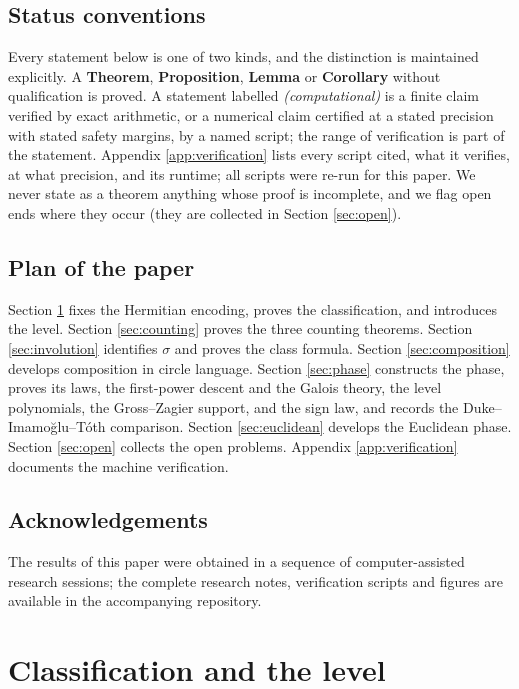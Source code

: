 \documentclass[11pt]{amsart}
\numberwithin{equation}{section}
\theoremstyle{plain}
\theoremstyle{definition}
\theoremstyle{remark}
\begin{document}
\subsection*{Status conventions}
Every statement below is one of two kinds, and the distinction is
maintained explicitly.  A \textbf{Theorem}, \textbf{Proposition},
\textbf{Lemma} or \textbf{Corollary} without qualification is proved.  A
statement labelled \emph{(computational)} is a finite claim verified by
exact arithmetic, or a numerical claim certified at a stated precision
with stated safety margins, by a named script; the range of verification
is part of the statement.  Appendix \ref{app:verification} lists every
script cited, what it verifies, at what precision, and its runtime; all
scripts were re-run for this paper.  We never state as a theorem anything
whose proof is incomplete, and we flag open ends where they occur (they
are collected in Section \ref{sec:open}).

\subsection*{Plan of the paper}
Section \ref{sec:classification} fixes the Hermitian encoding, proves the
classification, and introduces the level.  Section \ref{sec:counting}
proves the three counting theorems.  Section \ref{sec:involution}
identifies $\sigma$ and proves the class formula.  Section
\ref{sec:composition} develops composition in circle language.  Section
\ref{sec:phase} constructs the phase, proves its laws, the first-power
descent and the Galois theory, the level polynomials, the Gross--Zagier
support, and the sign law, and records the Duke--Imamo\u{g}lu--T\'oth
comparison.  Section \ref{sec:euclidean} develops the Euclidean phase.
Section \ref{sec:open} collects the open problems.  Appendix
\ref{app:verification} documents the machine verification.

\subsection*{Acknowledgements}
The results of this paper were obtained in a sequence of
computer-assisted research sessions; the complete research notes,
verification scripts and figures are available in the accompanying
repository.

\section{Classification and the level}\label{sec:classification}
\end{document}
